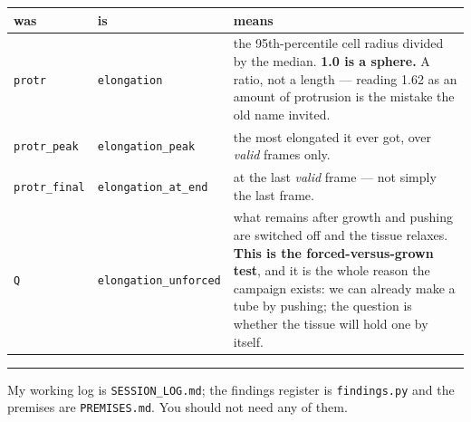\documentclass[11pt,a4paper]{article}
\newcommand{\code}[1]{\texttt{#1}}
\begin{document}
\begin{center}\small
\begin{tabular}{@{}l l p{7.9cm}@{}}
\toprule
\textbf{was} & \textbf{is} & \textbf{means}\\
\midrule
\code{protr} & \code{elongation}
& the 95th-percentile cell radius divided by the median. \textbf{1.0 is a sphere.} A ratio, not a
length --- reading 1.62 as an amount of protrusion is the mistake the old name invited.\\
\code{protr\_peak} & \code{elongation\_peak}
& the most elongated it ever got, over \emph{valid} frames only.\\
\code{protr\_final} & \code{elongation\_at\_end}
& at the last \emph{valid} frame --- not simply the last frame.\\
\code{Q} & \code{elongation\_unforced}
& what remains after growth and pushing are switched off and the tissue relaxes.
\textbf{This is the forced-versus-grown test}, and it is the whole reason the campaign exists: we
can already make a tube by pushing; the question is whether the tissue will hold one by itself.\\
\bottomrule
\end{tabular}
\end{center}

\vspace{6pt}
\hrule
\vspace{6pt}
{\small\color{grey}
My working log is \texttt{SESSION\_LOG.md}; the findings register is \texttt{findings.py} and the
premises are \texttt{PREMISES.md}. You should not need any of them.}
\end{document}

